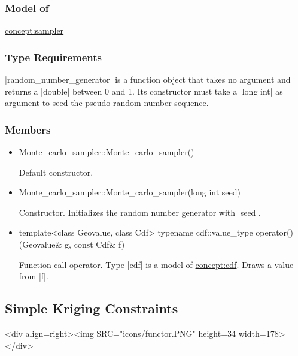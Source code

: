 \documentclass[12pt,twoside]{report}
\begin{document}
\htmlrule[CLEAR=all]  \subsubsection*{Model of}
\hyperref{Sampler}{Sampler (see Section}{)}{concept:sampler}

\htmlrule[CLEAR=all]  \subsubsection*{Type Requirements}
|random_number_generator| is a function object that takes no argument and returns a |double| between 0 and 1. Its constructor must take a |long int| as argument to seed the pseudo-random number sequence.

 
\htmlrule[CLEAR=all]  \subsubsection*{Members}
\begin{itemize}

\item
 \begin{code} 
Monte_carlo_sampler::Monte_carlo_sampler()
\end{code}

Default constructor.

\item
 \begin{code} 
Monte_carlo_sampler::Monte_carlo_sampler(long int seed)
\end{code}

Constructor. Initializes the random number generator with |seed|.



\item
 \begin{code} 
template<class Geovalue, class Cdf>
typename cdf::value_type 
operator()(Geovalue& g, const Cdf& f)
\end{code}

Function call operator. Type |cdf| is a model of \hyperref{CDF}{CDF}{}{concept:cdf}. Draws a value from |f|.
\end{itemize}










\subsection{Simple Kriging Constraints}
\begin{htmlonly}
<div align=right><img SRC="icons/functor.PNG" height=34 width=178></div>
\end{htmlonly}
\end{document}
